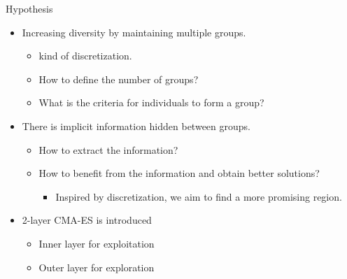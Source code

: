 \begin{frame}{Hypothesis}

  \begin{itemize}
    \item Increasing diversity by maintaining multiple groups.
      \begin{itemize}
        \item kind of discretization.
        \item How to define the number of groups?
        \item What is the criteria for individuals to form a group?
      \end{itemize}
      \vspace*{14pt}
    \item There is implicit information hidden between groups.
      \begin{itemize}
        \item How to extract the information?
        \item How to benefit from the information and obtain
          better solutions?
          \begin{itemize}
            \item Inspired by discretization, we aim to find a more
              promising region.
          \end{itemize}
      \end{itemize}
      \vspace*{14pt}
    \item 2-layer CMA-ES is introduced
      \begin{itemize}
        \item Inner layer for exploitation
        \item Outer layer for exploration
      \end{itemize}
  \end{itemize}

\end{frame}
